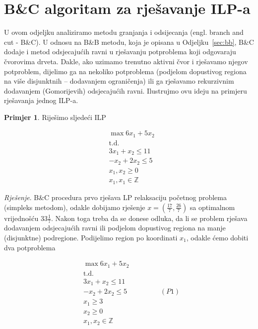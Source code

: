 \documentclass[a4paper, utf8, 11pt, colorlinks]{book}
\theoremstyle{definition}
\newtheorem{primjer}{Primjer}[chapter]
\begin{document}
\section{B\&C algoritam za rješavanje ILP-a}
U ovom odjeljku analiziramo metodu granjanja i odsijecanja (engl. branch and cut - B\&C). U odnosu na B\&B metodu, koja je opisana u Odjeljku~\ref{sec:bb}, B\&C dodaje  i metod odsjecajućih ravni u rješavanju  potproblema koji odgovaraju čvorovima drveta. Dakle, ako  uzimamo trenutno aktivni čvor i rješavamo njegov potproblem, dijelimo ga na nekoliko potproblema (podjelom dopustivog regiona na više disjunktnih -- dodavanjem ograničenja) ili ga rješavamo rekurzivnim dodavanjem (Gomorijevih) odsjecajućih ravni. Ilustrujmo ovu ideju na primjeru rješavanja jednog ILP-a.

\begin{primjer} Riješimo sljedeći ILP
	\end{primjer}
\begin{align*}
    &\max 6 x_1 + 5 x_2 \\
    &  \mbox{t.d. } \\
    & 3x_1 + x_2 \leq 11 \\
    & - x_2 + 2 x_2 \leq 5 \\
    & x_1, x_2 \geq 0 \\
    & x_1, x_1 \in \mathbb{Z}
\end{align*}

\emph{Rješenje}. B\&C procedura prvo rješava LP relaksaciju početnog problema (simpleks metodom), odakle dobijamo rješenje $x=(\frac{17}{7}, \frac{26}{7})$
sa optimalnom vrijednošću $33\frac{1}{7}$. Nakon toga treba da se donese odluka, da li se problem rješava dodavanjem odsjecajućih ravni ili podjelom dopustivog regiona na manje (disjunktne) podregione. Podijelimo region po koordinati $x_1$, odakle ćemo dobiti dva potproblema 

\begin{align*}
    &\max 6 x_1 + 5 x_2 \\
     &  \mbox{t.d. } \\
    & 3x_1 + x_2 \leq 11 \\
    & - x_2 + 2 x_2 \leq 5 \hspace{2cm} (P1) \\
    & x_1 \geq 3 \\
    & x_2 \geq 0 \\
    & x_1, x_2 \in \mathbb{Z}
\end{align*}
\end{document}
